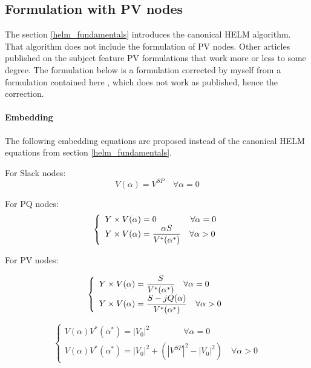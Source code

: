 \documentclass[nols,a4paper,twoside,symmetric,notoc,fleqn]{tufte-book}
\begin{document}
\subsection{Formulation with PV nodes}

The section \ref{helm_fundamentals} introduces the canonical HELM algorithm. That algorithm does not include the formulation of PV nodes.
Other articles published on the subject feature PV formulations that work more or less to some degree. The formulation below is a formulation corrected by myself from a formulation contained here \cite{liu2017online}, which does not work as published, hence the correction.



\paragraph{Embedding}

The following embedding equations are proposed instead of the canonical HELM equations from section \ref{helm_fundamentals}.

For Slack nodes:
\begin{equation}
V(\alpha) = V^{SP} \quad \forall \alpha=0
\end{equation}

For PQ nodes:
\begin{equation}
\left\{
\begin{array}{ll}
{Y} \times {V}(\alpha) = 0 \quad \quad \quad \quad \forall \alpha=0\\
\mathlarger{{Y} \times {V}(\alpha) = \frac{\alpha {S}}{{V}^*(\alpha^*)}} \quad \forall \alpha>0
\end{array}
\right.
\end{equation}

For PV nodes:

\begin{equation}
\left\{
\begin{array}{ll}
\mathlarger{{Y} \times {V}(\alpha) = \frac{ {S}}{{V}^*(\alpha^*)}} \quad \forall \alpha=0\\
\mathlarger{{Y} \times {V}(\alpha) = \frac{ {S} - j {Q}(\alpha)}{{V}^*(\alpha^*)}} \quad \forall \alpha>0
\end{array}
\right.
\end{equation}

\begin{equation}
\left\{
\begin{array}{ll}
V(\alpha)V^*(\alpha^*) = |V_0|^2\quad \quad \quad \quad \forall \alpha=0\\
V(\alpha)V^*(\alpha^*) = |V_0|^2 + (|V^{SP}|^2-|V_0|^2) \quad \forall \alpha>0
\end{array}
\right.
\end{equation}
\end{document}

